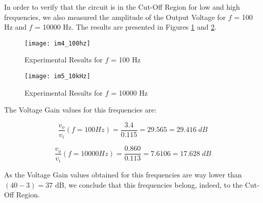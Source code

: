 In order to verify that the circuit is in the Cut-Off Region for low and high frequencies, we also measured the amplitude of the Output Voltage for $f$ = 100 Hz and $f$ = 10000 Hz. The results are presented in Figures \ref{fig:exp100Hz} and \ref{fig:exp10000Hz}.

\FloatBarrier
\begin{figure}[h] \centering
	\texttt{[image: im4\_100hz]}
	\caption{Experimental Results for $f$ = 100 Hz}
	\label{fig:exp100Hz}
\end{figure}
\FloatBarrier

\FloatBarrier
\begin{figure}[h] \centering
	\texttt{[image: im5\_10kHz]}
	\caption{Experimental Results for $f$ = 10000 Hz}
	\label{fig:exp10000Hz}
\end{figure}
\FloatBarrier

The Voltage Gain values for this frequencies are:

\begin{equation}
	\frac{v_o}{v_i}(f = 100 Hz) = \frac{3.4}{0.115} = 29.565 = 29.416\;dB
	\label{eq:gain100Exp}
\end{equation} 

\begin{equation}
	\frac{v_o}{v_i}(f = 10000 Hz) = \frac{0.860}{0.113} = 7.6106 = 17.628\;dB
	\label{eq:gain10000Exp}
\end{equation} 

As the Voltage Gain values obtained for this frequencies are way lower than $(40 - 3) = 37$ dB, we conclude that this frequencies belong, indeed, to the Cut-Off Region. 
